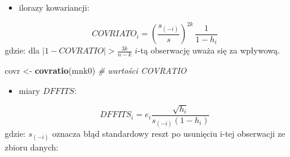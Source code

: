 \documentclass[polish,]{book}
\newenvironment{Shaded}{\begin{snugshade}}{\end{snugshade}}
\newcommand{\CommentTok}[1]{\textcolor[rgb]{0.56,0.35,0.01}{\textit{#1}}}
\newcommand{\DecValTok}[1]{\textcolor[rgb]{0.00,0.00,0.81}{#1}}
\newcommand{\KeywordTok}[1]{\textcolor[rgb]{0.13,0.29,0.53}{\textbf{#1}}}
\newcommand{\NormalTok}[1]{#1}
\newcommand{\OperatorTok}[1]{\textcolor[rgb]{0.81,0.36,0.00}{\textbf{#1}}}
\newcommand{\StringTok}[1]{\textcolor[rgb]{0.31,0.60,0.02}{#1}}
\providecommand{\tightlist}{%
  \setlength{\itemsep}{0pt}\setlength{\parskip}{0pt}}
\begin{document}
\begin{Shaded}
\end{Shaded}

\begin{itemize}
\tightlist
\item
  ilorazy kowariancji:
\end{itemize}

\begin{equation}
COVRIATO_i=\left(\frac{s_{(-i)}}{s}\right)^{2k}\,\frac{1}{1-h_i}
\label{eq:wz1319}
\end{equation}
gdzie: dla \(|1-COVRATIO|>\frac{3k}{n-k}\) \(i\)-tą obserwację uważa się za wpływową.

\begin{Shaded}
\begin{Highlighting}[]
\NormalTok{covr <-}\StringTok{ }\KeywordTok{covratio}\NormalTok{(mnk0)  }\CommentTok{# wartości COVRATIO}
\end{Highlighting}
\end{Shaded}

\begin{itemize}
\tightlist
\item
  miary \(DFFITS\):
\end{itemize}

\begin{equation}
DFFITS_i=e_i\frac{\sqrt{h_i}}{s_{(-i)}(1-h_i)}
\label{eq:wz1320}
\end{equation}
gdzie: \(s_{(-i)}\) oznacza błąd standardowy reszt po usunięciu i-tej obserwacji ze zbioru danych:
\end{document}
